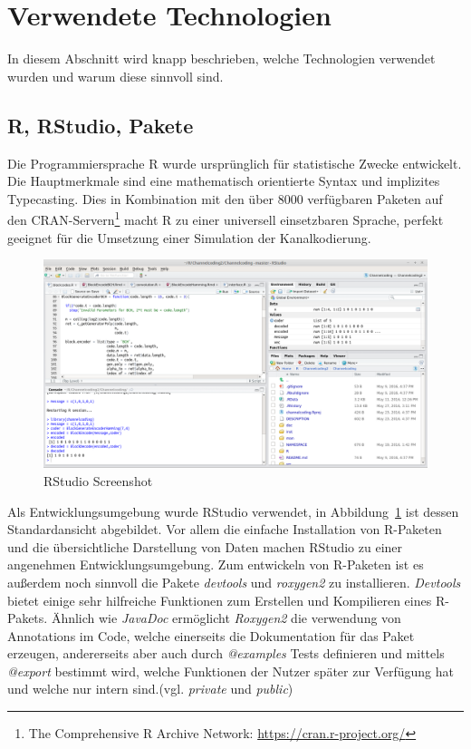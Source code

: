 
\section{Verwendete Technologien}
\label{section:technologies}

In diesem Abschnitt wird knapp beschrieben, welche Technologien verwendet wurden und warum diese sinnvoll sind.

\subsection{R, RStudio, Pakete}

Die Programmiersprache R wurde ursprünglich für statistische Zwecke entwickelt. Die Hauptmerkmale sind eine mathematisch orientierte Syntax und implizites Typecasting. Dies in Kombination mit den über 8000 verfügbaren Paketen auf den CRAN-Servern\footnote{The Comprehensive R Archive Network: \url{https://cran.r-project.org/}} macht R zu einer universell einsetzbaren Sprache, perfekt geeignet für die Umsetzung einer Simulation der Kanalkodierung.\cite{rmanual}

\begin{figure}[t]
\centering
\includegraphics[width=\ScaleIfNeeded]{pictures/rstudio}
\caption{RStudio Screenshot}
\label{pic:rstudio}
\end{figure}

Als Entwicklungsumgebung wurde RStudio verwendet, in Abbildung~\ref{pic:rstudio} ist dessen Standardansicht abgebildet. Vor allem die einfache Installation von R-Paketen und die übersichtliche Darstellung von Daten machen RStudio zu einer angenehmen Entwicklungsumgebung. Zum entwickeln von R-Paketen ist es außerdem noch sinnvoll die Pakete \emph{devtools} und \emph{roxygen2} zu installieren. \emph{Devtools} bietet einige sehr hilfreiche Funktionen zum Erstellen und Kompilieren eines R-Pakets.\cite{devtools} Ähnlich wie \emph{JavaDoc} ermöglicht \emph{Roxygen2} die verwendung von Annotations im Code, welche einerseits die Dokumentation für das Paket erzeugen, andererseits aber auch durch \emph{@examples} Tests definieren und mittels \emph{@export} bestimmt wird, welche Funktionen der Nutzer später zur Verfügung hat und welche nur intern sind.(vgl. \emph{private} und \emph{public})\cite{roxygen}

